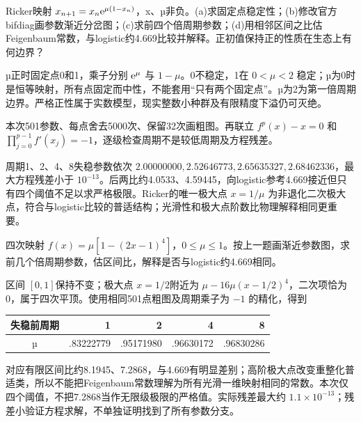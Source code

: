 \begin{exercise}\label{task:chaos-PS10-2}
Ricker映射 $x_{n+1}=x_n\mathrm e^{\mu(1-x_n)}$，x、µ非负。(a)求固定点稳定性；(b)修改官方bifdiag画参数渐近分岔图；(c)求前四个倍周期参数；(d)用相邻区间之比估Feigenbaum常数，与logistic约4.669比较并解释。正初值保持正的性质在生态上有何边界？
\end{exercise}
\begin{solution}
µ正时固定点0和1，乘子分别 $\mathrm e^\mu$ 与 $1-\mu$。0不稳定，1在 $0<\mu<2$ 稳定；µ为0时是恒等映射，所有点固定而中性，不能套用“只有两个固定点”。µ为2为第一倍周期边界。严格正性属于实数模型，现实整数小种群及有限精度下溢仍可灭绝。

本次501参数、每点舍去5000次、保留32次画粗图。再联立 $f^{p}(x)-x=0$ 和 $\prod_{j=0}^{p-1}f'(x_j)=-1$，逐级检查周期不是较低周期及方程残差。
\begin{center}\end{center}
周期1、2、4、8失稳参数依次 $2.00000000,2.52646773,2.65635327,2.68462336$，最大方程残差小于 $10^{-13}$。后两比约4.0533、4.59445，向logistic参考4.669接近但只有四个阈值不足以求严格极限。Ricker的唯一极大点 $x=1/\mu$ 为非退化二次极大点，符合与logistic比较的普适结构；光滑性和极大点阶数比物理解释相同更重要。
\end{solution}
\begin{exercise}\label{task:chaos-PS10-3}
四次映射 $f(x)=\mu[1-(2x-1)^4]$，$0\le\mu\le1$。按上一题画渐近参数图，求前几个倍周期参数，估区间比，解释是否与logistic约4.669相同。
\end{exercise}
\begin{solution}
区间 $[0,1]$保持不变；极大点 $x=1/2$附近为 $\mu-16\mu(x-1/2)^4$，二次项恰为0，属于四次平顶。使用相同501点粗图及周期乘子为 $-1$ 的精化，得到
\begin{center}\begin{tabular}{c|rrrr}失稳前周期&1&2&4&8\\\hline
µ&.83222779&.95171980&.96630172&.96830286
\end{tabular}\end{center}
\begin{center}\end{center}
对应有限区间比约8.1945、7.2868，与4.669有明显差别；高阶极大点改变重整化普适类，所以不能把Feigenbaum常数理解为所有光滑一维映射相同的常数。本次仅四个阈值，不把7.2868当作无限级极限的严格值。实际残差最大约 $1.1\times10^{-13}$；残差小验证方程求解，不单独证明找到了所有参数分支。
\end{solution}
